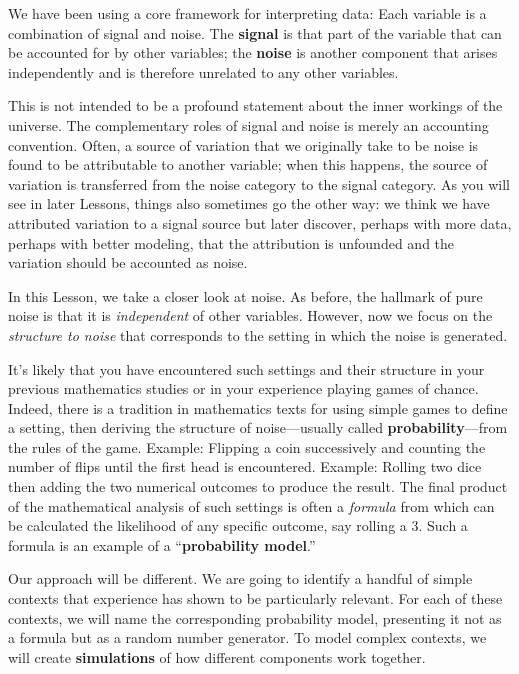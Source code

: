 \documentclass[
  letterpaper,
  DIV=11,
  numbers=noendperiod,
  oneside]{scrartcl}
\begin{document}
We have been using a core framework for interpreting data: Each variable
is a combination of signal and noise. The \textbf{signal} is that part
of the variable that can be accounted for by other variables; the
\textbf{noise} is another component that arises independently and is
therefore unrelated to any other variables.

This is not intended to be a profound statement about the inner workings
of the universe. The complementary roles of signal and noise is merely
an accounting convention. Often, a source of variation that we
originally take to be noise is found to be attributable to another
variable; when this happens, the source of variation is transferred from
the noise category to the signal category. As you will see in later
Lessons, things also sometimes go the other way: we think we have
attributed variation to a signal source but later discover, perhaps with
more data, perhaps with better modeling, that the attribution is
unfounded and the variation should be accounted as noise.

In this Lesson, we take a closer look at noise. As before, the hallmark
of pure noise is that it is \emph{independent} of other variables.
However, now we focus on the \emph{structure to noise} that corresponds
to the setting in which the noise is generated.

It's likely that you have encountered such settings and their structure
in your previous mathematics studies or in your experience playing games
of chance. Indeed, there is a tradition in mathematics texts for using
simple games to define a setting, then deriving the structure of
noise---usually called \textbf{probability}---from the rules of the
game. Example: Flipping a coin successively and counting the number of
flips until the first head is encountered. Example: Rolling two dice
then adding the two numerical outcomes to produce the result. The final
product of the mathematical analysis of such settings is often a
\emph{formula} from which can be calculated the likelihood of any
specific outcome, say rolling a 3. Such a formula is an example of a
``\textbf{probability model}.''

Our approach will be different. We are going to identify a handful of
simple contexts that experience has shown to be particularly relevant.
For each of these contexts, we will name the corresponding probability
model, presenting it not as a formula but as a random number generator.
To model complex contexts, we will create \textbf{simulations} of how
different components work together.
\end{document}
